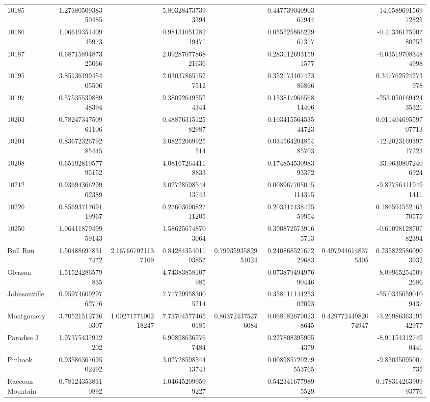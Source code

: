 \begin{tabular}{lrrrrrrr}
10185 & 1.2738050938350485 &  & 5.803284737393394 &  & 0.44773904090367944 &  & -14.658969156972825 \\
10186 & 1.0661935140945973 &  & 0.9813105128219471 &  & 0.05552586622967317 &  & -0.4133617590780252 \\
10187 & 0.6871589487325066 &  & 2.0928707786821636 &  & 0.2831126931591577 &  & -6.035197083484998 \\
10195 & 3.8513619945405506 &  & 2.030378651527512 &  & 0.35217340742386866 &  & 0.347762524273978 \\
10197 & 0.5753553988948394 &  & 9.380926495524344 &  & 0.15381796656814406 &  & -253.05016942435321 \\
10203 & 0.7824734750961106 &  & 0.4887631512582987 &  & 0.10341556453544723 &  & 0.01140469559707713 \\
10204 & 0.8367232679285445 &  & 3.08252069925514 &  & 0.03456420485485703 &  & -12.202316939717223 \\
10208 & 0.6519281957795152 &  & 4.081672644118833 &  & 0.17485453098393372 &  & -33.96308072406924 \\
10212 & 0.9369436629902389 &  & 3.0272859854413743 &  & 0.008967705015114315 &  & -9.827564119491411 \\
10220 & 0.8569371769119967 &  & 0.2760369082711205 &  & 0.20331743842559954 &  & 0.18659455216570575 \\
10250 & 1.0641187949959143 &  & 1.586256748703064 &  & 0.3908725739165713 &  & -0.6109812870782394 \\
Bull Run & 1.504886978317472 & 2.167667021137169 & 0.8428435401193857 & 0.7993593582951024 & 0.24086852767229683 & 0.4979446148375305 & 0.2358225860903932 \\
Gleason & 1.51524286579835 &  & 4.74383858107985 &  & 0.07387949497690446 &  & -8.099652545092686 \\
Johnsonville & 0.9597460929762776 &  & 7.717299583005214 &  & 0.35811114425302093 &  & -55.03356590109437 \\
Montgomery & 3.705215127360307 & 1.0027177100218247 & 7.737045774650185 & 0.863724375276084 & 0.0681826790238645 & 0.42977244982074947 & -3.2698636319542977 \\
Paradise 3 & 1.97375437912202 &  & 6.908986365767484 &  & 0.2278083959054379 &  & -8.911543127490441 \\
Pinhook & 0.9358636769502492 &  & 3.0272859854413743 &  & 0.008985720279553765 &  & -9.85035095007735 \\
Raccoon Mountain & 0.781243538310892 &  & 1.046452099599227 &  & 0.5423416779895529 &  & 0.17831426390993776 \\

\end{tabular}
